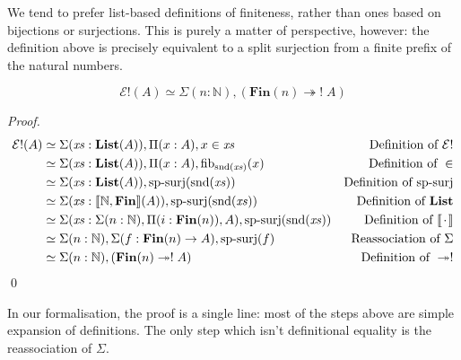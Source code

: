 We tend to prefer list-based definitions of finiteness, rather than ones based
on bijections or surjections.
This is purely a matter of perspective, however: the definition above is
precisely equivalent to a split surjection from a finite prefix of the natural
numbers.
\begin{romlemma} \label{split-enum-is-split-surj}
  \begin{equation}
    \mathcal{E}!(A) \simeq \Sigma (n : \mathbb{N}) , \left( \mathbf{Fin}(n) \twoheadrightarrow ! \; A \right)
  \end{equation}
\end{romlemma}
\begin{proof}
  \begin{align*}
    \mathcal{E}!(A)
    & \simeq \Sigma (\mathit{xs} : \textbf{List}(A)) , \Pi {(x : A)} , x \in \mathit{xs}
    & \text{Definition of } \mathcal{E}!
    \\
    & \simeq \Sigma (\mathit{xs} : \textbf{List}(A)) , \Pi {(x : A)} , \text{fib}_{\text{snd}(\mathit{xs})}(x)
    & \text{Definition of } \in
    \\
    & \simeq \Sigma (\mathit{xs} : \textbf{List}(A)) , \text{sp-surj}(\text{snd}(\mathit{xs}))
    & \text{Definition of sp-surj}
    \\
    & \simeq \Sigma (\mathit{xs} : \llbracket \mathbb{N} , \mathbf{Fin} \rrbracket (A)) , \text{sp-surj}(\text{snd}(\mathit{xs}))
    & \text{Definition of } \mathbf{List}
    \\
    & \simeq \Sigma (\mathit{xs} : \Sigma (n : \mathbb{N}) , \Pi (i : \mathbf{Fin}(n)) , A) , \text{sp-surj}(\text{snd}(\mathit{xs}))
    & \text{Definition of } \llbracket {\mkern 2mu\cdot\mkern 2mu} \rrbracket
    \\
    & \simeq \Sigma (n : \mathbb{N}) , \Sigma (f : \mathbf{Fin}(n) \rightarrow A) , \text{sp-surj}(f)
    & \text{Reassociation of } \Sigma
    \\
    & \simeq \Sigma (n : \mathbb{N}) , ( \mathbf{Fin}(n) \twoheadrightarrow ! \; A )
    & \text{Definition of } \twoheadrightarrow!
  \end{align*}
  \qed
\end{proof}

In our formalisation, the proof is a single line: most of the steps above are
simple expansion of definitions.
The only step which isn't definitional equality is the reassociation of
\(\Sigma\).

